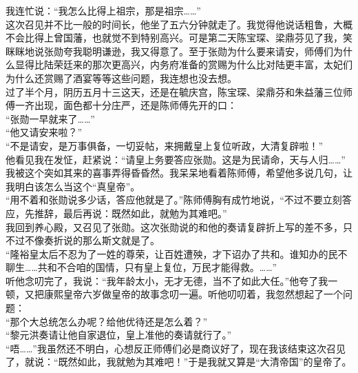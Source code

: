 我连忙说：“我怎么比得上祖宗，那是祖宗……”\\

这次召见并不比一般的时间长，他坐了五六分钟就走了。我觉得他说话粗鲁，大概不会比得上曾国藩，也就觉不到特别高兴。可是第二天陈宝琛、梁鼎芬见了我，笑眯眯地说张勋夸我聪明谦逊，我又得意了。至于张勋为什么要来请安，师傅们为什么显得比陆荣廷来的那次更高兴，内务府准备的赏赐为什么比对陆更丰富，太妃们为什么还赏赐了酒宴等等这些问题，我连想也没去想。\\

过了半个月，阴历五月十三这天，还是在毓庆宫，陈宝琛、梁鼎芬和朱益藩三位师傅一齐出现，面色都十分庄严，还是陈师傅先开的口：\\

“张勋一早就来了……”\\

“他又请安来啦？”\\

“不是请安，是万事俱备，一切妥帖，来拥戴皇上复位听政，大清复辟啦！”\\

他看见我在发怔，赶紧说：“请皇上务要答应张勋。这是为民请命，天与人归……”\\

我被这个突如其来的喜事弄得昏昏然。我呆呆地看着陈师傅，希望他多说几句，让我明白该怎么当这个“真皇帝”。\\

“用不着和张勋说多少话，答应他就是了。”陈师傅胸有成竹地说，“不过不要立刻答应，先推辞，最后再说：既然如此，就勉为其难吧。”\\

我回到养心殿，又召见了张勋。这次张勋说的和他的奏请复辟折上写的差不多，只不过不像奏折说的那么斯文就是了。\\

“隆裕皇太后不忍为了一姓的尊荣，让百姓遭殃，才下诏办了共和。谁知办的民不聊生……共和不合咱的国情，只有皇上复位，万民才能得救。……”\\

听他念叨完了，我说：“我年龄太小，无才无德，当不了如此大任。”他夸了我一顿，又把康熙皇帝六岁做皇帝的故事念叨一遍。听他叨叨着，我忽然想起了一个问题：\\

“那个大总统怎么办呢？给他优待还是怎么着？”\\

“黎元洪奏请让他自家退位，皇上准他的奏请就行了。”\\

“唔……”我虽然还不明白，心想反正师傅们必是商议好了，现在我该结束这次召见了，就说：“既然如此，我就勉为其难吧！”于是我就又算是“大清帝国”的皇帝了。\\


